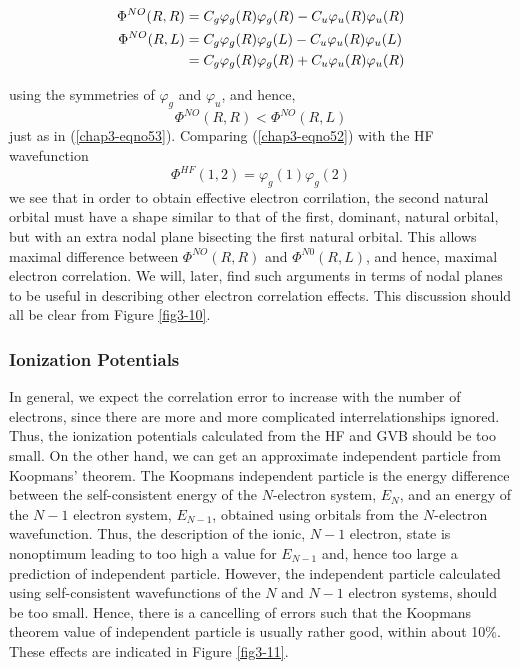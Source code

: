 \begin{eqnarray}
\Phi^{NO} (R,R) &= C_g \varphi_g (R) \varphi_g(R) - C_u \varphi_u (R) \varphi_u 
(R)\\
\Phi^{NO} (R,L) &= C_g \varphi_g (R) \varphi_g (L) - C_u \varphi_u (R) \varphi_u 
(L)\\
&= C_g \varphi_g (R) \varphi_g (R) + C_u \varphi_u (R) \varphi_u (R)\cr
\end{eqnarray}

\noindent using the symmetries of $\varphi_g$ and $\varphi_u$, and hence,
\begin{equation}
\Phi^{NO} (R,R) < \Phi^{NO}(R,L)
\end{equation}
just as in (\ref{chap3-eqno53}).  Comparing (\ref{chap3-eqno52}) with
the HF wavefunction
\begin{equation}
\Phi^{HF} (1,2) = \varphi_g (1) \varphi_g (2)
\end{equation}
we see that in order to obtain effective electron corrilation, the
second natural orbital must have a shape similar to that of the first,
dominant, natural orbital, but with an extra nodal plane bisecting the
first natural orbital.  This allows maximal difference between
$\Phi^{NO} (R, R)$ and $\Phi^{N0} (R , L)$, and hence, maximal
electron correlation. We will, later, find such arguments in terms of
nodal planes to be useful in describing other electron correlation
effects. This discussion should all be clear from Figure
\ref{fig3-10}.

\subsubsection{Ionization Potentials}

In general, we expect the correlation error to increase with the number 
of electrons, since there are more and more complicated interrelationships 
ignored.  Thus, the ionization potentials calculated from the HF 
and GVB should be too small.  On the other hand, we 
can get an approximate independent particle from Koopmans' theorem.  The 
Koopmans independent particle is the energy difference between the 
self-consistent energy of the $N$-electron system, $E_N$, and an energy 
of the $N-1$ electron system, $E_{N-1}$, obtained using orbitals from 
the $N$-electron wavefunction.  Thus, the description of the ionic, $N - 1$ 
electron, state is nonoptimum leading to too high a value for $E_{N-1}$ 
and, hence too large a prediction of independent particle.  However, the
independent particle calculated using self-consistent wavefunctions of 
the $N$ and $N - 1$ electron systems, should be too small.  Hence, there 
is a cancelling of errors such that the Koopmans theorem value of 
independent particle is usually rather good, within about
10\%. These effects are indicated in Figure \ref{fig3-11}.


